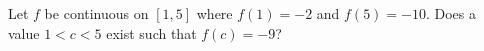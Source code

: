 \documentclass{ximera}
\author{Gregory Hartman \and Matthew Carr}
\begin{document}
\begin{exercise}



Let $f$ be continuous on $\left[1,5\right]$ where $f(1)=-2$ and $f(5)=-10$. Does a value $1<c<5$ exist such that $f(c)=-9$?

\begin{prompt}
\begin{multipleChoice}
\end{multipleChoice}
\end{prompt}

\end{exercise}
\end{document}

